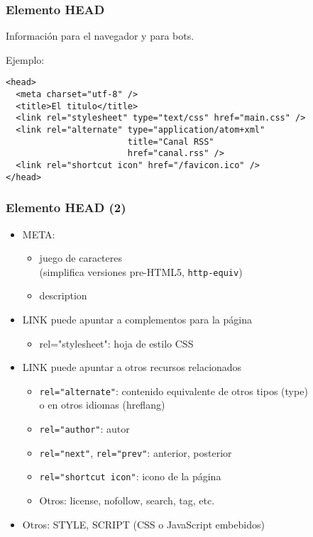 
\begin{frame}[fragile]
\frametitle{Elemento HEAD}

Información para el navegador y para bots.

Ejemplo:

\begin{verbatim}
<head>
  <meta charset="utf-8" />
  <title>El titulo</title>
  <link rel="stylesheet" type="text/css" href="main.css" />
  <link rel="alternate" type="application/atom+xml"
                        title="Canal RSS"
                        href="canal.rss" />
  <link rel="shortcut icon" href="/favicon.ico" />
</head>
\end{verbatim}

\end{frame}

\begin{frame}[fragile]
\frametitle{Elemento HEAD (2)}

\begin{itemize}
\item META:
  \begin{itemize}
  \item juego de caracteres \\
    (simplifica versiones pre-HTML5, \verb|http-equiv|)
  \item  description
  \end{itemize}
\item LINK puede apuntar a complementos para la página
  \begin{itemize}
  \item rel="stylesheet": hoja de estilo CSS
  \end{itemize} 
\item LINK puede apuntar a otros recursos relacionados
  \begin{itemize}
  \item \verb|rel="alternate"|: contenido equivalente de otros tipos (type) \\
    o en otros idiomas (hreflang)
  \item \verb|rel="author"|: autor
  \item \verb|rel="next"|, \verb|rel="prev"|: anterior, posterior
  \item \verb|rel="shortcut icon"|: icono de la página
  \item Otros: license, nofollow, search, tag, etc.
  \end{itemize} 
\item Otros: STYLE, SCRIPT (CSS o JavaScript embebidos)
\end{itemize}

\end{frame}

